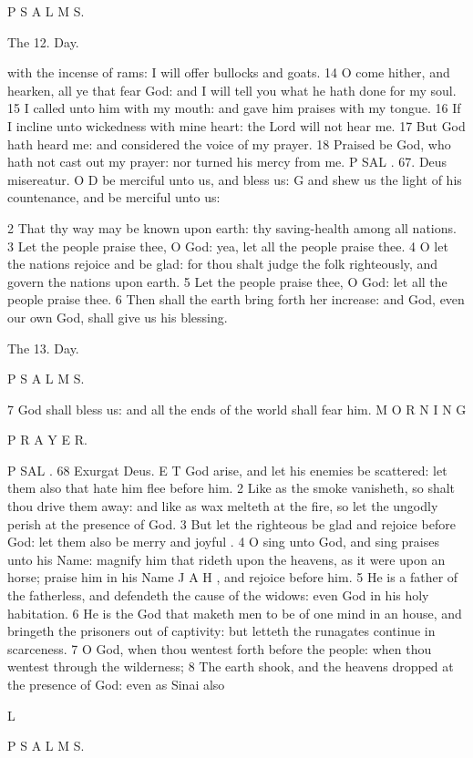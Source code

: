 P S A L M S.

The 12. Day.

with the incense of rams: I will offer bullocks and goats. 14 O come hither, and hearken, all ye that fear God: and I will tell you what he hath done for my soul. 15 I called unto him with my mouth: and gave him praises with my tongue. 16 If I incline unto wickedness with mine heart: the Lord will not hear me. 17 But God hath heard me: and considered the voice of my prayer. 18 Praised be God, who hath not cast out my prayer: nor turned his mercy from me. P SAL . 67. Deus misereatur. O D be merciful unto us, and bless us: G and shew us the light of his countenance, and be merciful unto us:

2 That thy way may be known upon earth: thy saving-health among all nations. 3 Let the people praise thee, O God: yea, let all the people praise thee. 4 O let the nations rejoice and be glad: for thou shalt judge the folk righteously, and govern the nations upon earth. 5 Let the people praise thee, O God: let all the people praise thee. 6 Then shall the earth bring forth her increase: and God, even our own God, shall give us his blessing.

The 13. Day.

P S A L M S.

7 God shall bless us: and all the ends of the world shall fear him. M O R N I N G

P R A Y E R.

P SAL . 68 Exurgat Deus. E T God arise, and let his enemies be scattered: let them also that hate him flee before him. 2 Like as the smoke vanisheth, so shalt thou drive them away: and like as wax melteth at the fire, so let the ungodly perish at the presence of God. 3 But let the righteous be glad and rejoice before God: let them also be merry and joyful . 4 O sing unto God, and sing praises unto his Name: magnify him that rideth upon the heavens, as it were upon an horse; praise him in his Name J A H , and rejoice before him. 5 He is a father of the fatherless, and defendeth the cause of the widows: even God in his holy habitation. 6 He is the God that maketh men to be of one mind in an house, and bringeth the prisoners out of captivity: but letteth the runagates continue in scarceness. 7 O God, when thou wentest forth before the people: when thou wentest through the wilderness; 8 The earth shook, and the heavens dropped at the presence of God: even as Sinai also

L

P S A L M S.

